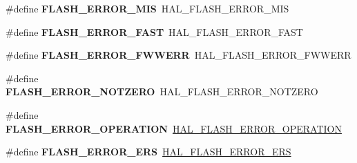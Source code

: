 \begin{DoxyCompactItemize}
\mbox{\label{group___h_a_l___f_l_a_s_h___aliased___defines_ga10229d78c25e0d944031910606462be1}} 
\#define {\bfseries F\+L\+A\+S\+H\+\_\+\+E\+R\+R\+O\+R\+\_\+\+M\+IS}~H\+A\+L\+\_\+\+F\+L\+A\+S\+H\+\_\+\+E\+R\+R\+O\+R\+\_\+\+M\+IS
\item 
\mbox{\label{group___h_a_l___f_l_a_s_h___aliased___defines_gad20c28b002e14116facba21f02b0d1ba}} 
\#define {\bfseries F\+L\+A\+S\+H\+\_\+\+E\+R\+R\+O\+R\+\_\+\+F\+A\+ST}~H\+A\+L\+\_\+\+F\+L\+A\+S\+H\+\_\+\+E\+R\+R\+O\+R\+\_\+\+F\+A\+ST
\item 
\mbox{\label{group___h_a_l___f_l_a_s_h___aliased___defines_ga9386eae0fe9e5b47720ad2378d27e743}} 
\#define {\bfseries F\+L\+A\+S\+H\+\_\+\+E\+R\+R\+O\+R\+\_\+\+F\+W\+W\+E\+RR}~H\+A\+L\+\_\+\+F\+L\+A\+S\+H\+\_\+\+E\+R\+R\+O\+R\+\_\+\+F\+W\+W\+E\+RR
\item 
\mbox{\label{group___h_a_l___f_l_a_s_h___aliased___defines_ga987edd2bf3a39310a655473718d9b495}} 
\#define {\bfseries F\+L\+A\+S\+H\+\_\+\+E\+R\+R\+O\+R\+\_\+\+N\+O\+T\+Z\+E\+RO}~H\+A\+L\+\_\+\+F\+L\+A\+S\+H\+\_\+\+E\+R\+R\+O\+R\+\_\+\+N\+O\+T\+Z\+E\+RO
\item 
\mbox{\label{group___h_a_l___f_l_a_s_h___aliased___defines_gaae29e90680573edfa4e11e07b2557f16}} 
\#define {\bfseries F\+L\+A\+S\+H\+\_\+\+E\+R\+R\+O\+R\+\_\+\+O\+P\+E\+R\+A\+T\+I\+ON}~\mbox{\hyperlink{group___f_l_a_s_h___error___code_gafa1433e0ca2366478928c04244310d44}{H\+A\+L\+\_\+\+F\+L\+A\+S\+H\+\_\+\+E\+R\+R\+O\+R\+\_\+\+O\+P\+E\+R\+A\+T\+I\+ON}}
\item 
\mbox{\label{group___h_a_l___f_l_a_s_h___aliased___defines_gaf908de74b3e013ed30976d9e645354e2}} 
\#define {\bfseries F\+L\+A\+S\+H\+\_\+\+E\+R\+R\+O\+R\+\_\+\+E\+RS}~\mbox{\hyperlink{group___f_l_a_s_h___error___code_ga53543cb5bd961dbc612e919d0558eea4}{H\+A\+L\+\_\+\+F\+L\+A\+S\+H\+\_\+\+E\+R\+R\+O\+R\+\_\+\+E\+RS}}
\item 
\mbox{\label{group___h_a_l___f_l_a_s_h___aliased___defines_gac332a5aa5da146e19f3c39067220f0f8}} 

\end{DoxyCompactItemize}
